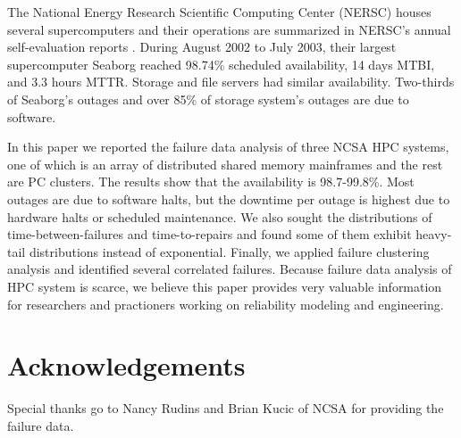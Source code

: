 \documentclass[10pt,twocolumn]{article}
\begin{document}
The National Energy Research Scientific Computing Center 
(NERSC) houses several supercomputers and their operations 
are summarized in NERSC's annual self-evaluation reports 
\cite{NERSC02}. During August 2002 to July 2003, their 
largest supercomputer Seaborg reached 98.74\% scheduled 
availability, 14 days MTBI, and 3.3 hours MTTR. Storage 
and file servers had similar availability. Two-thirds 
of Seaborg's outages and over 85\% of storage system's 
outages are due to software.

\label{s:concl}
In this paper we reported the failure data analysis of
three NCSA HPC systems, one of which is an array of
distributed shared memory mainframes and the rest are
PC clusters. The results show that the availability 
is 98.7-99.8\%. Most outages are due to software halts, 
but the downtime per outage is highest due to 
hardware halts or scheduled maintenance.
We also sought the distributions of time-between-failures
and time-to-repairs and found some of them exhibit 
heavy-tail distributions instead of exponential. 
Finally, we applied failure clustering analysis and identified
several correlated failures. Because failure data
analysis of HPC system is scarce, we believe this paper 
provides very valuable information for researchers and 
practioners working on reliability modeling and engineering.

\section*{Acknowledgements}
Special thanks go to Nancy Rudins and Brian Kucic of NCSA
for providing the failure data.



\end{document}
